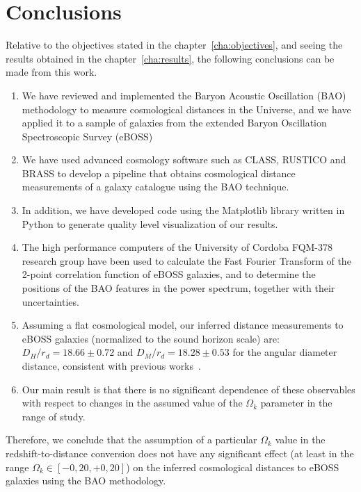 \chapter*{Conclusions}

Relative to the objectives stated in the chapter~\ref{cha:objectives}, and seeing the results obtained in the chapter~\ref{cha:results}, the following conclusions can be made from this work.

\begin{enumerate}
	\item We have reviewed and implemented the Baryon Acoustic Oscillation (BAO) methodology to measure cosmological distances in the Universe, and we have applied it to a sample of galaxies from the extended Baryon Oscillation Spectroscopic Survey (eBOSS)
	\item We have used advanced cosmology software such as CLASS, RUSTICO and BRASS to develop a pipeline that obtains cosmological distance measurements of a galaxy catalogue using the BAO technique.
	\item In addition, we have developed code using the Matplotlib library written in Python to generate quality level visualization of our results.
	\item The high performance computers of the University of Cordoba FQM-378 research group have been used to calculate the Fast Fourier Transform of the 2-point correlation function of eBOSS galaxies, and to determine the positions of the BAO features in the power spectrum, together with their uncertainties.
	\item Assuming a flat cosmological model, our inferred distance measurements to eBOSS galaxies (normalized to the sound horizon scale) are: $D_H/r_d = 18.66 \pm 0.72$ and $D_M/r_d = 18.28 \pm 0.53$ for the angular diameter distance, consistent with previous works~\cite{hector}.
	\item Our main result is that there is no significant dependence of these observables with respect to changes in the assumed value of the $\Omega_k$ parameter in the range of study.
\end{enumerate}

Therefore, we conclude that the assumption of a particular $\Omega_k$ value in the redshift-to-distance conversion does not have any significant effect (at least in the range $\Omega_k \in [-0,20, +0,20]$) on the inferred cosmological distances to eBOSS galaxies using the BAO methodology.

